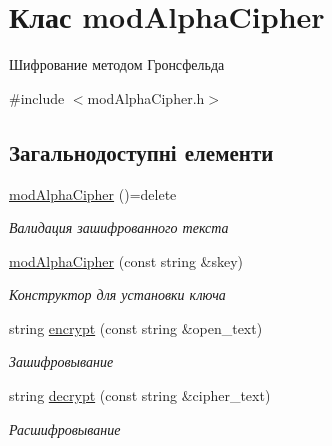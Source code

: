 \hypertarget{classmodAlphaCipher}{}\section{Клас mod\+Alpha\+Cipher}
\label{classmodAlphaCipher}


Шифрование методом Гронсфельда  




{\ttfamily \#include $<$mod\+Alpha\+Cipher.\+h$>$}

\subsection*{Загальнодоступні елементи}
\begin{DoxyCompactItemize}
\item 
\hyperlink{classmodAlphaCipher_a4f0a86c20f5d836f66cb1e640d875e6b}{mod\+Alpha\+Cipher} ()=delete
\begin{DoxyCompactList}\small\item\em Валидация зашифрованного текста \end{DoxyCompactList}\item 
\hyperlink{classmodAlphaCipher_a6c6305969b8a57ac1c1c9cc5f5215b6d}{mod\+Alpha\+Cipher} (const string \&skey)
\begin{DoxyCompactList}\small\item\em Конструктор для установки ключа \end{DoxyCompactList}\item 
string \hyperlink{classmodAlphaCipher_a704e2999580f33b8c01ad634a3efb4dd}{encrypt} (const string \&open\+\_\+text)
\begin{DoxyCompactList}\small\item\em Зашифровывание \end{DoxyCompactList}\item 
string \hyperlink{classmodAlphaCipher_ad79b06b2d0df98964b9d86283adf9513}{decrypt} (const string \&cipher\+\_\+text)
\begin{DoxyCompactList}\small\item\em Расшифровывание \end{DoxyCompactList}\end{DoxyCompactItemize}
